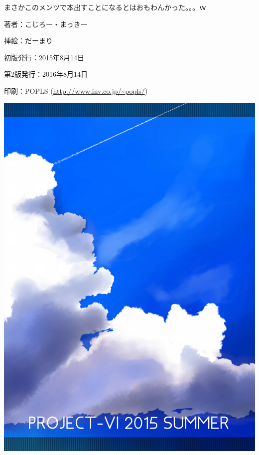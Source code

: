 ﻿\documentclass[9pt,b5paper,tombo,openany]{jsbook}
\begin{document}
まさかこのメンツで本出すことになるとはおもわんかった。。。ｗ

\newpage

\thispagestyle{empty}
\begin{flushright}
\begin{minipage}{0.5\hsize}
\begin{description}
  \item{著者：}こじろー・まっきー
  \item{挿絵：}だーまり
  \item{初版発行：}2015年8月14日
  \item{第2版発行：}2016年8月14日
  \item{印刷：}POPLS (\url{http://www.inv.co.jp/~popls/})
\end{description}
\end{minipage}
\end{flushright}

\mbox{}
\newpage
\thispagestyle{empty}
\mbox{}
\newpage
\thispagestyle{empty}

\newpage

\enlargethispage{\paperwidth}
\thispagestyle{empty}
\vspace*{-1truein}
\vspace*{-\topmargin}
\vspace*{-1.15\headheight}
\vspace*{-\headsep}
\vspace*{-\topskip}
\noindent\hspace*{-1.16in}\hspace*{-\oddsidemargin}
\includegraphics[width=1.042\paperwidth]{./img/ura-hyoushi.pdf}
\end{document}
